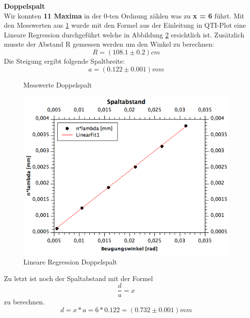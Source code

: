 \documentclass[12pt,a4paper]{article}
\begin{document}
\begin{multicols}{2}
\noindent
\textbf{Doppelspalt}\\
Wir konnten \textbf{11 Maxima} in der 0-ten Ordnung zählen was zu \textbf{x = 6} führt. 
Mit den Messwerten aus \ref{tab:werte_doppelspalt} wurde mit den Formel aus der Einleitung in QTI-Plot eine Lineare Regression durchgeführt welche in Abbildung \ref{fig:doppelspalt_linreg} ersichtlich ist. 
Zusätzlich musste der Abstand R gemessen werden um den Winkel zu berechnen:
$$R = (108.1 \pm 0.2)cm$$
Die Steigung ergibt folgende Spaltbreite:
$$a = (0.122 \pm 0.001)mm$$
\begin{figure}[H]
	\centering
	\caption{Messwerte Doppelspalt}
	\label{tab:werte_doppelspalt}
\end{figure}
\begin{figure}[H]
	\centering
	\includegraphics[scale=0.4]{./figure/linreg_doppelspalt.png}
	\caption{Lineare Regression Doppelspalt}
	\label{fig:doppelspalt_linreg}
\end{figure}
\noindent
Zu letzt ist noch der Spaltabstand mit der Formel 
$$\frac{d}{a} = x$$
\noindent
zu berechnen.
$$d = x*a = 6 * 0.122 = (0.732 \pm 0.001)mm$$


\end{multicols}
\end{document}
